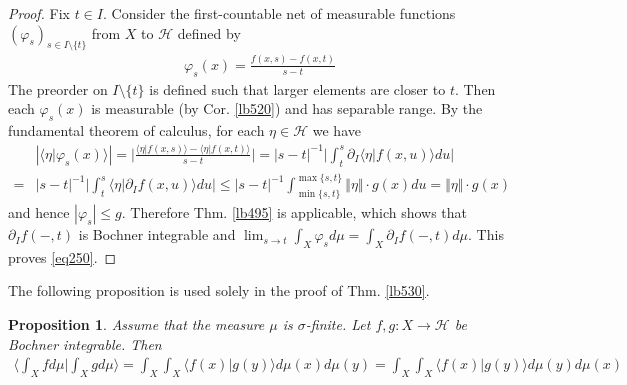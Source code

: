 \documentclass[12pt,b5paper,notitlepage]{article}
\theoremstyle{definition}
\theoremstyle{plain}
\newtheorem{pp}[df]{Proposition}
\newcommand{\bk}[1]{\langle {#1}\rangle}
\newcommand{\Bigbk}[1]{\Big\langle {#1}\Big\rangle}
\newcommand{\MH}{\mathcal H}
\numberwithin{equation}{section}
\begin{document}
\begin{subappendices}
\begin{proof}
Fix $t\in I$. Consider the first-countable net of measurable functions $(\varphi_s)_{s\in I\setminus\{t\}}$ from $X$ to $\MH$ defined by
\begin{align*}
\varphi_s(x)=\frac{f(x,s)-f(x,t)}{s-t}
\end{align*}
The preorder on $I\setminus\{t\}$ is defined such that larger elements are closer to $t$. Then each $\varphi_s(x)$ is measurable (by Cor. \ref{lb520}) and has separable range. By the fundamental theorem of calculus, for each $\eta\in\MH$ we have
\begin{align*}
&|\bk{\eta|\varphi_s(x)}|=\Big|\frac{\bk{\eta|f(x,s)}-\bk{\eta|f(x,t)}}{s-t}\Big|=|s-t|^{-1}\Big|\int_t^s \partial_I\bk{\eta|f(x,u)}du\Big|\\
=&|s-t|^{-1}\Big|\int_t^s \bk{\eta|\partial_If(x,u)}du\Big|\leq |s-t|^{-1} \int_{\min\{s,t\}}^{\max\{s,t\}}\Vert\eta\Vert\cdot g(x)du=\Vert\eta\Vert\cdot g(x)
\end{align*}
and hence $|\varphi_s|\leq g$. Therefore Thm. \ref{lb495} is applicable, which shows that $\partial_If(-,t)$ is Bochner integrable and $\lim_{s\rightarrow t}\int_X\varphi_sd\mu=\int_X\partial_If(-,t)d\mu$. This proves \eqref{eq250}.
\end{proof}


The following proposition is used solely in the proof of Thm. \ref{lb530}. 

\begin{pp}\label{lb514}
Assume that the measure $\mu$ is $\sigma$-finite. Let $f,g:X\rightarrow\MH$ be Bochner integrable. Then
\begin{align*}
\Bigbk{\int_Xfd\mu\Big|\int_Xgd\mu}=\int_X\int_X\bk{f(x)|g(y)}d\mu(x)d\mu(y)=\int_X\int_X\bk{f(x)|g(y)}d\mu(y)d\mu(x)
\end{align*}
\end{pp}


\end{subappendices}
\end{document}
